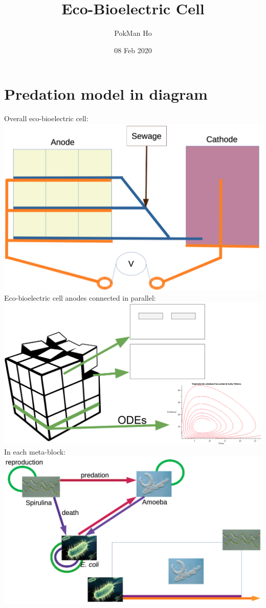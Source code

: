 \documentclass[a4paper,11pt]{article}
\title{Eco-Bioelectric Cell}
\author{PokMan Ho}
\date{08 Feb 2020}
\begin{document}
    \maketitle
    \tableofcontents

    \section{Predation model in diagram}
    Overall eco-bioelectric cell:\\
    \includegraphics[width=\linewidth]{sandbox/graph/battery.png}
    Eco-bioelectric cell anodes connected in parallel:\\
    \includegraphics[width=\linewidth]{sandbox/graph/modelOverview.png}
    In each meta-block:\\
    \includegraphics[width=\linewidth]{sandbox/graph/model.png}
    
\end{document}
